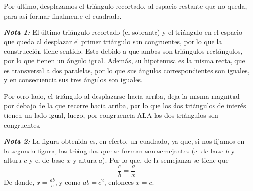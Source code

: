 \documentclass{amsart}
\begin{document}
{    Por último, desplazamos el triángulo recortado, al espacio restante que no queda, para así formar finalmente el cuadrado.

    \begin{figure}[H]
        \centering
    \end{figure}

    \textit{\textbf{Nota 1:}} El último triángulo recortado (el sobrante) y el triángulo en el espacio que queda al desplazar el primer triángulo son congruentes, por lo que la construcción tiene sentido. Esto debido a que ambos son triángulos rectángulos, por lo que tienen un ángulo igual. Además, su hipotenusa es la misma recta, que es transversal a dos paralelas, por lo que sus ángulos correspondientes son iguales, y en consecuencia sus tres ángulos son iguales.

    Por otro lado, el triángulo al desplazarse hacia arriba, deja la misma magnitud por debajo de la que recorre hacia arriba, por lo que los dos triángulos de interés tienen un lado igual, luego, por congruencia ALA los dos triángulos son congruentes.

    \textit{\textbf{Nota 2:}} La figura obtenida es, en efecto, un cuadrado, ya que, si nos fijamos en la segunda figura, los triángulos que se forman son semejantes (el de base $b$ y altura $c$ y el de base $x$ y altura $a$). Por lo que, de la semejanza se tiene que 
    $$ \frac{c}{b} = \frac{a}{x}$$
    De donde, $x = \frac{ab}{c}$, y como $ab=c^2$, entonces $x=c$.
}

\newpage
\end{document}
